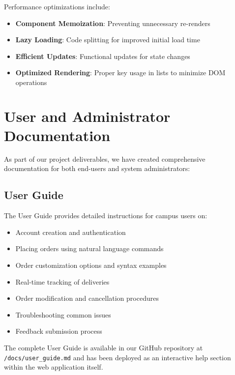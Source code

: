 \documentclass[12pt]{article}
\begin{document}
Performance optimizations include:
\begin{itemize}
    \item \textbf{Component Memoization}: Preventing unnecessary re-renders
    \item \textbf{Lazy Loading}: Code splitting for improved initial load time
    \item \textbf{Efficient Updates}: Functional updates for state changes
    \item \textbf{Optimized Rendering}: Proper key usage in lists to minimize DOM operations
\end{itemize}

\section{User and Administrator Documentation}

As part of our project deliverables, we have created comprehensive documentation for both end-users and system administrators:

\subsection{User Guide}
The User Guide provides detailed instructions for campus users on:
\begin{itemize}
    \item Account creation and authentication
    \item Placing orders using natural language commands
    \item Order customization options and syntax examples
    \item Real-time tracking of deliveries
    \item Order modification and cancellation procedures
    \item Troubleshooting common issues
    \item Feedback submission process
\end{itemize}

The complete User Guide is available in our GitHub repository at \texttt{/docs/user\_guide.md} and has been deployed as an interactive help section within the web application itself.
\end{document}
